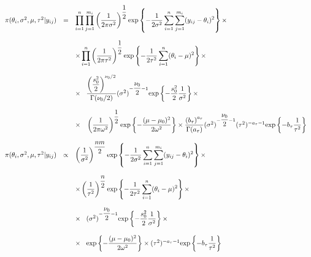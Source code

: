 \documentclass[a4paper, 11pt]{article}
\begin{document}
\begin{equation*}
\begin{array}{lcl ll }
\pi(\theta_i, \sigma^2, \mu, \tau^2 |y_{ij}) & = & \displaystyle\prod_{i=1}^{n}\displaystyle\prod_{j=1}^{m_i}\left(\dfrac{1}{2\pi\sigma^2}\right)^{\dfrac{1}{2}}\mbox{exp}\left\{ - \dfrac{1}{2\sigma^2}\displaystyle\sum_{i=1}^{n}\displaystyle\sum_{j=1}^{m_i}(y_{ij} - \theta_i)^2\right\} \times \\ \\

& & \times \displaystyle\prod_{i=1}^{n}\left(\dfrac{1}{2\pi\tau^2}\right)^{\dfrac{1}{2}}\mbox{exp}\left\{ - \dfrac{1}{2\tau^2} 
\displaystyle\sum_{i=1}^{n} (\theta_i - \mu)^2\right\} \times \\ \\

& & \times \hspace{0.3cm} \dfrac{\left(\dfrac{s_0^2}{2}\right)^{\nu_0/2}}{\Gamma(\nu_0/2)}(\sigma^2)^{-\dfrac{\nu_0}{2}-1} \mbox{exp}\left\{ - \dfrac{s_0^2}{2}\dfrac{1}{\sigma^2}\right\} \times \\ \\

& & \times \hspace{0.3cm}\left(\dfrac{1}{2\pi\omega^2}\right)^{\dfrac{1}{2}}\mbox{exp}\left\{ - \dfrac{(\mu - \mu_0)^2}{2\omega^2}\right\} \times\dfrac{\left(b_\tau\right)^{a_\tau}}{\Gamma(a_\tau)}(\sigma^2)^{-\dfrac{\nu_0}{2}-1} (\tau^2)^{-a_\tau-1} \mbox{exp}\left\{ - b_\tau\dfrac{1}{\tau^2}\right\} \\ \\

\pi(\theta_i, \sigma^2, \mu, \tau^2 |y_{ij}) & \propto & \left(\dfrac{1}{\sigma^2}\right)^{\dfrac{nm}{2}}\mbox{exp}\left\{ - \dfrac{1}{2\sigma^2}\displaystyle\sum_{i=1}^{n}\displaystyle\sum_{j=1}^{m_i}(y_{ij} - \theta_i)^2\right\} \times \\ \\

& & \times \left(\dfrac{1}{\tau^2}\right)^{\dfrac{n}{2}}\mbox{exp}\left\{ - \dfrac{1}{2\tau^2} 
\displaystyle\sum_{i=1}^{n} (\theta_i - \mu)^2\right\} \times \\ \\

& & \times \hspace{0.3cm}(\sigma^2)^{-\dfrac{\nu_0}{2}-1} \mbox{exp}\left\{ - \dfrac{s_0^2}{2}\dfrac{1}{\sigma^2}\right\} \times \\ \\

& & \times \hspace{0.3cm}\mbox{exp}\left\{ - \dfrac{(\mu - \mu_0)^2}{2\omega^2}\right\} \times (\tau^2)^{-a_\tau-1} \mbox{exp}\left\{ - b_\tau\dfrac{1}{\tau^2}\right\} \\ \\

 \end{array}
\end{equation*}
\end{document}
